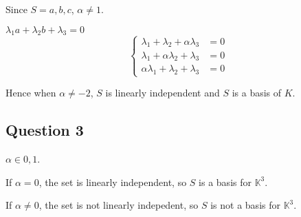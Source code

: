 \documentclass{article}
\begin{document}
Since $S={a,b,c}$, $\alpha \neq 1$.

$\lambda _{1}a+\lambda _{2}b+\lambda _{3}=0$
\begin{equation*}
    \left\{\begin{aligned}
        \lambda _{1}+\lambda _{2}+\alpha \lambda _{3} & =0 \\
        \lambda _{1}+\alpha\lambda _{2}+ \lambda _{3} & =0 \\
        \alpha\lambda _{1}+\lambda _{2}+\lambda _{3}  & =0
    \end{aligned}
    \right.
\end{equation*}

Hence when $\alpha \neq -2$, $S$ is linearly independent and $S$ is a basis of $K$.

\subsection{Question 3}

$\alpha \in {0,1}$.

If $\alpha =0$, the set is linearly independent, so $S$ is a basis for $\mathbb{K}^{3}$.

If $\alpha \neq 0$, the set is not linearly indepedent, so $S$ is not a basis for $\mathbb{K}^{3}$.
\end{document}
